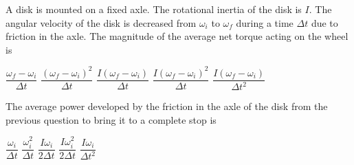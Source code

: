 \documentclass{../../oss-apphys-exam}
\begin{document}
\begin{multicols*}{2}
\begin{questions}
    \question A disk is mounted on a fixed axle. The rotational inertia of the
    disk is $I$. The angular velocity of the disk is decreased from $\omega_i$
    to $\omega_f$ during a time $\Delta t$ due to friction in the axle. The
    magnitude of the average net torque acting on the wheel is
    \begin{choices}
      \choice $\dfrac{\omega_f-\omega_i}{\Delta t}$
      \choice $\dfrac{(\omega_f-\omega_i)^2}{\Delta t}$
      \choice $\dfrac{I(\omega_f-\omega_i)}{\Delta t}$
      \choice $\dfrac{I(\omega_f-\omega_i)^2}{\Delta t}$
      \choice $\dfrac{I(\omega_f-\omega_i)}{\Delta t^2}$
    \end{choices}
    
    \question The average power developed by the friction in the axle of the
    disk from the previous question to bring it to a complete stop is
    \begin{choices}
      \choice $\dfrac{\omega_i}{\Delta t}$
      \choice $\dfrac{\omega_i^2}{\Delta t}$
      \choice $\dfrac{I\omega_i}{2\Delta t}$
      \choice $\dfrac{I\omega_i^2}{2\Delta t}$
      \choice $\dfrac{I\omega_i}{\Delta t^2}$
    \end{choices}
    \columnbreak
    
    

\end{questions}
\end{multicols*}
\end{document}
